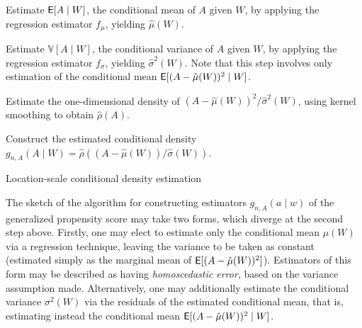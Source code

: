 \begin{algorithm}[H]
\label{alg:loc_scale_dens}
\SetAlgoLined
{}
\BlankLine

Estimate $\mathsf{E}[A \mid W]$, the conditional mean of $A$ given $W$, by applying the
regression estimator $f_{\mu}$, yielding $\hat{\mu}(W)$.

Estimate $\mathbb{V}[A \mid W]$, the conditional variance of $A$ given $W$, by
applying the regression estimator $f_{\sigma}$, yielding $\hat{\sigma}^2(W)$.
Note that this step involves only estimation of the conditional mean $\mathsf{E}[(A
- \hat{\mu}(W))^2 \mid W]$.

Estimate the one-dimensional density of $(A - \hat{\mu}(W))^2
/ \hat{\sigma}^2(W)$, using kernel smoothing to obtain $\hat{\rho}(A)$.

Construct the estimated conditional density $g_{n,A}(A \mid W) = \hat{\rho}((A
- \hat{\mu}(W)) / \hat{\sigma}(W))$.
\BlankLine

\caption{Location-scale conditional density estimation}
\end{algorithm}

The sketch of the algorithm for constructing estimators $g_{n,A}(a \mid w)$ of
the generalized propensity score may take two forms, which diverge at the second
step above. Firstly, one may elect to estimate only the conditional mean
$\mu(W)$ via a regression technique, leaving the variance to be taken as
constant (estimated simply as the marginal mean of $\mathsf{E}[(A - \hat{\mu}(W))^2]$).
Estimators of this form may be described as having \textit{homoscedastic error},
based on the variance assumption made. Alternatively, one may additionally
estimate the conditional variance $\sigma^2(W)$ via the residuals of the
estimated conditional mean, that is, estimating instead the conditional mean
$\mathsf{E}[(A - \hat{\mu}(W))^2 \mid W]$.

